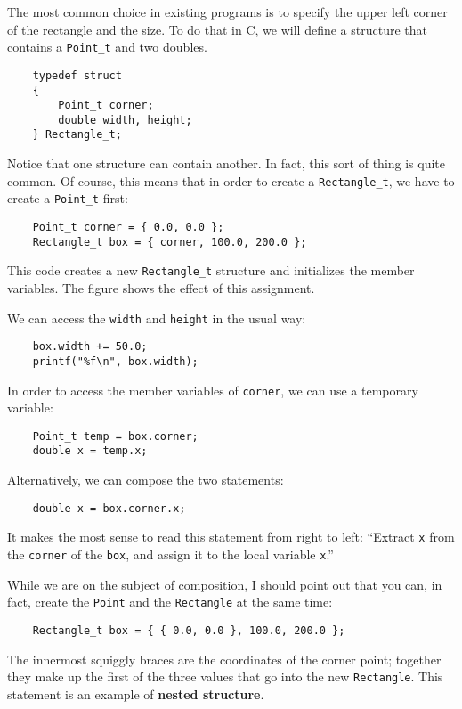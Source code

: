 The most common choice in existing programs is to specify the
upper left corner of the rectangle and the size.  To do that
in C, we will define a structure that contains a {\tt Point\_t}
and two doubles.

\begin{verbatim}
	typedef struct 
	{
		Point_t corner;
		double width, height;
	} Rectangle_t;  
\end{verbatim}
%
Notice that one structure can contain another.  In fact, this
sort of thing is quite common.  Of course, this means that in
order to create a {\tt Rectangle\_t}, we have to create a {\tt Point\_t}
first:

\begin{verbatim}
	Point_t corner = { 0.0, 0.0 };
	Rectangle_t box = { corner, 100.0, 200.0 };
\end{verbatim}
%
This code creates a new {\tt Rectangle\_t} structure and initializes the
member variables.  The figure shows the effect of this assignment.

\vspace{0.1in}
\centerline{}
\vspace{0.1in}
%
We can access the {\tt width} and {\tt height} in the usual way:

\begin{verbatim}
	box.width += 50.0;
	printf("%f\n", box.width);
\end{verbatim}
%
In order to access the member variables of {\tt corner}, we can use a
temporary variable:

\begin{verbatim}
	Point_t temp = box.corner;
	double x = temp.x;
\end{verbatim}
%
Alternatively, we can compose the two statements:


\begin{verbatim}
	double x = box.corner.x;
\end{verbatim}
%
It makes the most sense to read this statement from right to
left: ``Extract {\tt x} from the {\tt corner} of the {\tt box},
and assign it to the local variable {\tt x}.''

While we are on the subject of composition, I should point
out that you can, in fact, create the {\tt Point} and the
{\tt Rectangle} at the same time:

\begin{verbatim}
	Rectangle_t box = { { 0.0, 0.0 }, 100.0, 200.0 };
\end{verbatim}
%
The innermost squiggly braces are the coordinates of the
corner point; together they make up the first of the three
values that go into the new {\tt Rectangle}.  This statement
is an example of {\bf nested structure}.

